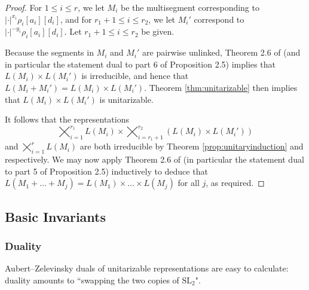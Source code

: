\documentclass{amsart}
\newcommand{\SL}{\mathrm{SL}}
\newcommand{\GL}{\mathrm{GL}}
\newcommand{\1}{\m 1}
\theoremstyle{remark}
\theoremstyle{definition}
\newtheorem{dfn}[thm]{Definition}
\numberwithin{equation}{subsection}
\begin{document}
\begin{proof}


For $1 \le i \le r$, we let $M_i$ be the multisegment corresponding to $|\cdot|^{x_i} \rho_i[a_i][d_i]$, and for $r_1 + 1 \le i \le r_2$, we let $M_i'$ correspond to $|\cdot|^{-y_i} \rho_i[a_i][d_i]$.  Let $r_1 + 1 \le i \le r_2$ be given. 

Because the segments in $M_i$ and $M_i'$ are pairwise unlinked, Theorem 2.6 of \cite{LM16} (and in particular the statement dual to part 6 of Proposition 2.5) implies that $L(M_i) \times L(M_i')$ is irreducible, and hence that $L(M_i + M_i') = L(M_i) \times L(M_i')$.  Theorem \ref{thm:unitarizable} then implies that $L(M_i) \times L(M_i')$ is unitarizable.  

It follows that the representations
\[
\bigtimes_{i = 1}^{r_1} L(M_i) \times \bigtimes_{i = r_1 + 1}^{r_2} (L(M_i) \times L(M_i'))
\]
and $\bigtimes_{i = 1}^r L(M_i)$ are both irreducible by Theorem \ref{prop:unitaryinduction} and \cite[Thm 1.9]{Zel80} respectively.  We may now apply Theorem 2.6 of \cite{LM16} (in particular the statement dual to part 5 of Proposition 2.5) inductively to deduce that $L(M_1 + \ldots + M_j) = L(M_1) \times \ldots \times L(M_j)$ for all $j$, as required.
\end{proof}


\subsection{Basic Invariants}

\subsubsection{Duality}
Aubert--Zelevinsky duals of unitarizable representations are easy to calculate: duality amounts to ``swapping the two copies of $
\SL_2$".
\end{document}
